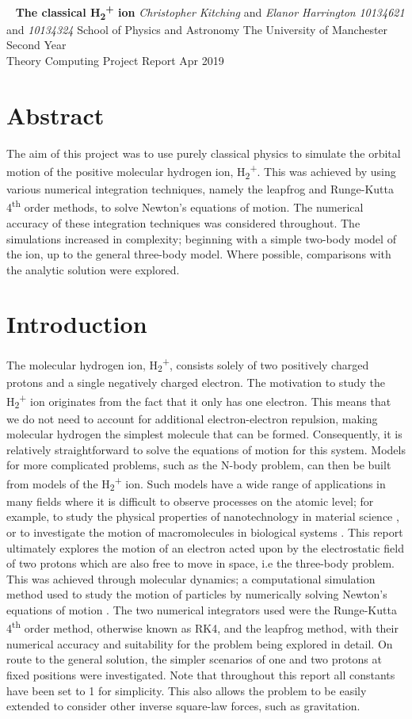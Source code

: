 \documentclass[12pt]{article} %
\numberwithin{equation}{subsection} %
\newcommand{\makecover}[8]{
\thispagestyle{empty}
\setcounter{page}{0}\vskip 24pt
\begin{center}~\vskip 0.6in \LARGE{\bf {#1}}\vskip 12pt \normalsize{\textit{#2} and \textit{#3}}\vskip 6pt
\textit{#4} and \textit{#5} \vskip 24pt School of Physics and Astronomy\vskip 6pt The University of Manchester\vskip 24pt {#6} Year \\Theory Computing Project Report\vskip 24pt {#7}\vskip 36pt \end{center}\vskip 80pt
\section*{Abstract}
{#8}
\newpage}
\begin{document}
\makecover
{The classical H\textsubscript{2}\textsuperscript{+} ion}
{Christopher Kitching}
{Elanor Harrington}
{10134621}
{10134324}
{Second}
{Apr 2019}
{The aim of this project was to use purely classical physics to simulate the orbital motion of the positive molecular hydrogen ion, H\textsubscript{2}\textsuperscript{+}. This was achieved by using various numerical integration techniques, namely the leapfrog and Runge-Kutta 4\textsuperscript{th} order methods, to solve Newton's equations of motion. The numerical accuracy of these integration techniques was considered throughout. The simulations increased in complexity; beginning with a simple two-body model of the ion, up to the general three-body model. Where possible, comparisons with the analytic solution were explored.}

\setcounter{page}{2} %

\section{Introduction}

The molecular hydrogen ion, H\textsubscript{2}\textsuperscript{+}, consists solely of two positively charged protons and a single negatively charged electron. The motivation to study the H\textsubscript{2}\textsuperscript{+} ion originates from the fact that it only has one electron. This means that we do not need to account for additional electron-electron repulsion, making molecular hydrogen the simplest molecule that can be formed. Consequently, it is relatively straightforward to solve the equations of motion for this system. Models for more complicated problems, such as the N-body problem, can then be built from models of the H\textsubscript{2}\textsuperscript{+} ion. Such models have a wide range of applications in many fields where it is difficult to observe processes on the atomic level; for example, to study the physical properties of nanotechnology in material science \cite{wang2012molecular}, or to investigate the motion of macromolecules in biological systems \cite{mccammon1977dynamics}. This report ultimately explores the motion of an electron acted upon by the electrostatic field of two protons which are also free to move in space, i.e the three-body problem. This was achieved through molecular dynamics; a computational simulation method used to study the motion of particles by numerically solving Newton's equations of motion \cite{alder1959studies}. The two numerical integrators used were the Runge-Kutta 4\textsuperscript{th} order method, otherwise known as RK4, and the leapfrog method, with their numerical accuracy and suitability for the problem being explored in detail. On route to the general solution, the simpler scenarios of one and two protons at fixed positions were investigated. Note that throughout this report all constants have been set to 1 for simplicity. This also allows the problem to be easily extended to consider other inverse square-law forces, such as gravitation.
\end{document}
